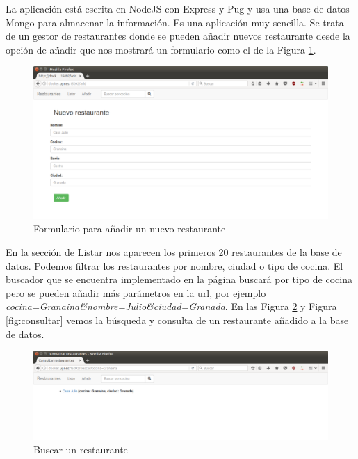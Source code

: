 La aplicación está escrita en NodeJS con Express y Pug y usa una base de datos Mongo para almacenar la información. Es una aplicación muy sencilla. Se trata de un gestor de restaurantes donde se pueden añadir nuevos restaurante desde la opción de añadir que nos mostrará un formulario como el de la Figura \ref{fig:nuevo}. \\

\begin{figure}[h!]
	\centering
	\includegraphics[width=13cm]{./images/nuevo}
	\caption{Formulario para añadir un nuevo restaurante} 
	\label{fig:nuevo}
\end{figure}

En la sección de Listar nos aparecen los primeros 20 restaurantes de la base de datos. Podemos filtrar los restaurantes por nombre, ciudad o tipo de cocina. El buscador que se encuentra implementado en la página buscará por tipo de cocina pero se pueden añadir más parámetros en la url, por ejemplo \textit{cocina=Granaina\&nombre=Julio\&ciudad=Granada}. En las Figura \ref{fig:buscar} y Figura \ref{fig:consultar} vemos la búsqueda y consulta de un restaurante añadido a la base de datos. \\

\begin{figure}[h!]
	\centering
	\includegraphics[width=13cm]{./images/buscar}
	\caption{Buscar un restaurante} 
	\label{fig:buscar}
\end{figure}


